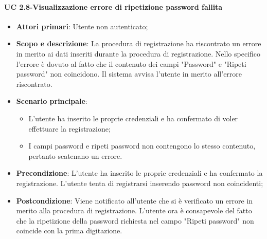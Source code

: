         \paragraph{UC 2.8-Visualizzazione errore di ripetizione password fallita}
            \begin{itemize}
                \item \textbf{Attori primari}: Utente non autenticato;
                \item \textbf{Scopo e descrizione}: La procedura di registrazione ha riscontrato un errore in merito ai
                dati inseriti durante la procedura di registrazione. Nello specifico l'errore è dovuto al fatto che il contenuto dei campi "Password" e "Ripeti password" non coincidono. Il sistema avvisa l'utente in merito all'errore riscontrato.
                \item \textbf{Scenario principale}: 
                    \begin{itemize}
                        \item L'utente ha inserito le proprie credenziali e ha confermato di voler effettuare la registrazione;
                        \item I campi password e ripeti password non contengono lo stesso contenuto, pertanto scatenano un errore.
                    \end{itemize}
                \item \textbf{Precondizione}: L'utente ha inserito le proprie credenziali e ha confermato la registrazione. L'utente tenta di registrarsi inserendo password non coincidenti;
                 \item \textbf{Postcondizione}: Viene notificato all'utente che si è verificato un errore in merito
                alla procedura di registrazione. L'utente ora è consapevole del fatto che la ripetizione della password richiesta nel campo "Ripeti password" non coincide con la prima digitazione.
            \end{itemize}
        
        
        
